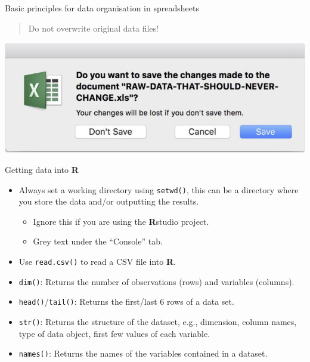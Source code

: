 \documentclass[ignorenonframetext,]{beamer}
\providecommand{\tightlist}{%
  \setlength{\itemsep}{0pt}\setlength{\parskip}{0pt}}
\begin{document}
\begin{frame}{Basic principles for data organisation in spreadsheets}

\begin{quote}
Do not overwrite original data files!
\end{quote}

\center \includegraphics{Figure/dont_overwrite_original.png}

\end{frame}

\begin{frame}[fragile]{Getting data into \textbf{R}}

\begin{itemize}
\item
  Always set a working directory using \texttt{setwd()}, this can be a
  directory where you store the data and/or outputting the results.

  \begin{itemize}
  \tightlist
  \item
    Ignore this if you are using the \textbf{R}studio project.
  \item
    Grey text under the ``Console'' tab.
  \end{itemize}
\item
  Use \texttt{read.csv()} to read a CSV file into \textbf{R}.
\item
  \texttt{dim()}: Returns the number of observations (rows) and
  variables (columns).
\item
  \texttt{head()}/\texttt{tail()}: Returns the first/last 6 rows of a
  data set.
\item
  \texttt{str()}: Returns the structure of the dataset, e.g., dimension,
  column names, type of data object, first few values of each variable.
\item
  \texttt{names()}: Returns the names of the variables contained in a
  dataset.
\end{itemize}

\end{frame}
\end{document}
